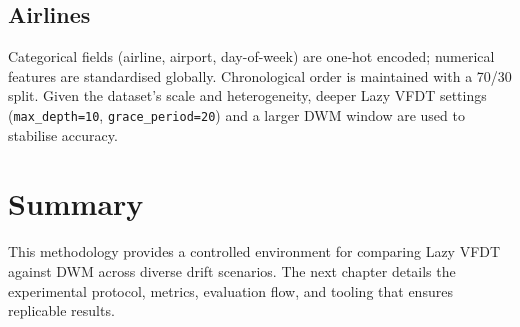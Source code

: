 \subsection{Airlines}
Categorical fields (airline, airport, day-of-week) are one-hot encoded; numerical features are standardised globally.  Chronological order is maintained with a 70/30 split.  Given the dataset's scale and heterogeneity, deeper Lazy VFDT settings (\texttt{max\_depth=10}, \texttt{grace\_period=20}) and a larger DWM window are used to stabilise accuracy.

\section{Summary}
This methodology provides a controlled environment for comparing Lazy VFDT against DWM across diverse drift scenarios. The next chapter details the experimental protocol, metrics, evaluation flow, and tooling that ensures replicable results.